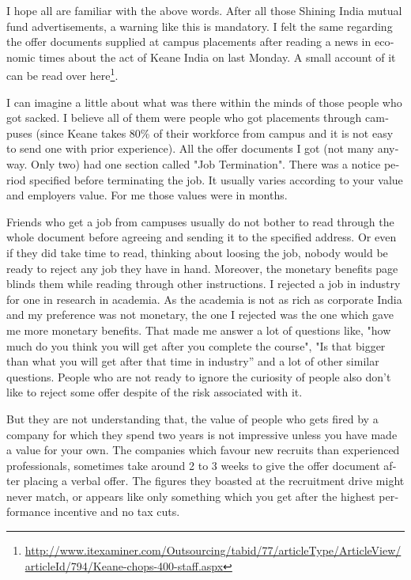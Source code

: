 \vskip 2pt

\begin{english}
I hope all are familiar with the above words. After all those Shining India mutual fund advertisements, a warning like this is mandatory. I felt the same regarding the offer documents supplied at campus placements after reading a news in economic times about the act of Keane India on last Monday. A small account of it can be read over here\footnote{\url{http://www.itexaminer.com/Outsourcing/tabid/77/articleType/ArticleView/articleId/794/Keane-chops-400-staff.aspx}}.

I can imagine a little about what was there within the minds of those people who got sacked. I believe all of them were people who got placements through campuses (since Keane takes 80\% of their workforce from campus and it is not easy to send one with prior experience). All the offer documents I got (not many anyway. Only two) had one section called "Job Termination". There was a notice period specified before terminating the job. It usually varies according to your value and employers value. For me those values were in months.

Friends who get a job from campuses usually do not bother to read through the whole document before agreeing and sending it to the specified address. Or even if they did take time to read, thinking about loosing the job, nobody would be ready to reject any job they have in hand. Moreover, the monetary benefits page blinds them while reading through other instructions. I rejected a job in industry for one in research in academia. As the academia is not as rich as corporate India and my preference was not monetary, the one I rejected was the one which gave me more monetary benefits. That made me answer a lot of questions like, "how much do you think you will get after you complete the course", "Is that bigger than what you will get after that time in industry'' and a lot of other similar questions. People who are not ready to ignore the curiosity of people also don’t like to reject some offer despite of the risk associated with it.

But they are not understanding that, the value of people who gets fired by a company for which they spend two years is not impressive unless you have made a value for your own. The companies which favour new recruits than experienced professionals, sometimes take around 2 to 3 weeks to give the offer document after placing a verbal offer. The figures they boasted at the recruitment drive might never match, or appears like only something which you get after the highest performance incentive and no tax cuts. 


\end{english}
